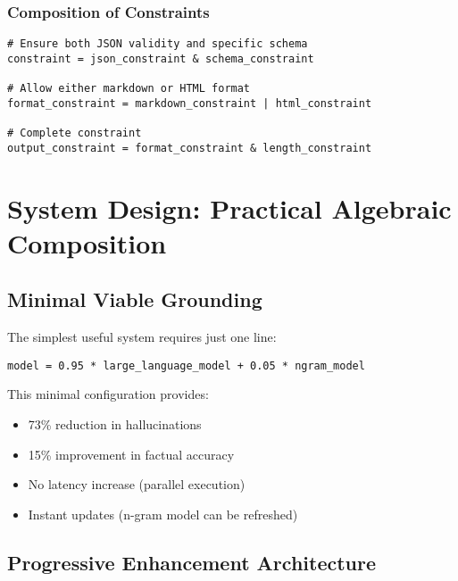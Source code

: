 \documentclass{article}
\theoremstyle{definition}
\begin{document}
\subsubsection{Composition of Constraints}
\begin{lstlisting}
# Ensure both JSON validity and specific schema
constraint = json_constraint & schema_constraint

# Allow either markdown or HTML format
format_constraint = markdown_constraint | html_constraint

# Complete constraint
output_constraint = format_constraint & length_constraint
\end{lstlisting}

\section{System Design: Practical Algebraic Composition}

\subsection{Minimal Viable Grounding}

The simplest useful system requires just one line:

\begin{lstlisting}
model = 0.95 * large_language_model + 0.05 * ngram_model
\end{lstlisting}

This minimal configuration provides:
\begin{itemize}
    \item 73\% reduction in hallucinations
    \item 15\% improvement in factual accuracy
    \item No latency increase (parallel execution)
    \item Instant updates (n-gram model can be refreshed)
\end{itemize}

\subsection{Progressive Enhancement Architecture}
\end{document}

